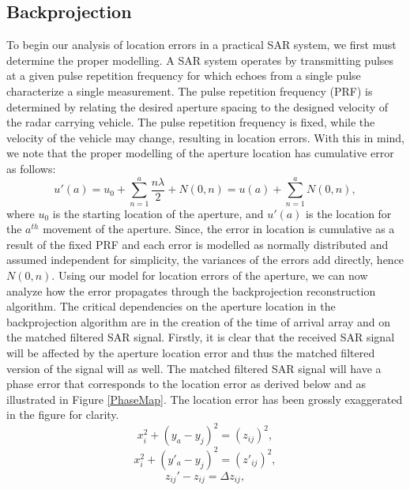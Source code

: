\documentclass{article}
\begin{document}
\subsection{Backprojection}
\indent \indent
To begin our analysis of location errors in a practical SAR system, we first must determine the proper modelling. A SAR system operates by transmitting pulses at a given pulse repetition frequency for which echoes from a single pulse characterize a single measurement. The pulse repetition frequency (PRF) is determined by relating the desired aperture spacing to the designed velocity of the radar carrying vehicle. The pulse repetition frequency is fixed, while the velocity of the vehicle may change, resulting in location errors. With this in mind, we note that the proper modelling of the aperture location has cumulative error as follows:
\begin{equation}
\label{Ap_location}
u'(a) = u_0+\sum_{n=1}^{a}\frac{n\lambda}{2}+N(0,n) = u(a)+\sum_{n=1}^{a}N(0,n),
\end{equation}
where $u_0$ is the starting location of the aperture, and $u'(a)$ is the location for the $a^{th}$ movement of the aperture. Since, the error in location is cumulative as a result of the fixed PRF and each error is modelled as normally distributed and assumed independent for simplicity, the variances of the errors add directly, hence $N(0,n)$. 
\newline
\indent
Using our model for location errors of the aperture, we can now analyze how the error propagates through the backprojection reconstruction algorithm. The critical dependencies on the aperture location in the backprojection algorithm are in the creation of the time of arrival array and on the matched filtered SAR signal. Firstly, it is clear that the received SAR signal will be affected by the aperture location error and thus the matched filtered version of the signal will as well. The matched filtered SAR signal will have a phase error that corresponds to the location error as derived below and as illustrated in Figure \ref{PhaseMap}. The location error has been grossly exaggerated in the figure for clarity.
\begin{equation}
\label{geom1}
x_i^2+(y_a-y_j)^2 = (z_{ij})^2,
\end{equation}
\begin{equation}
\label{geom2}
x_i^2+(y'_a-y_j)^2 = (z'_{ij})^2,
\end{equation}
\begin{equation}
\label{geom3}
z_{ij}'-z_{ij} = \Delta{z}_{ij},
\end{equation}
\end{document}
